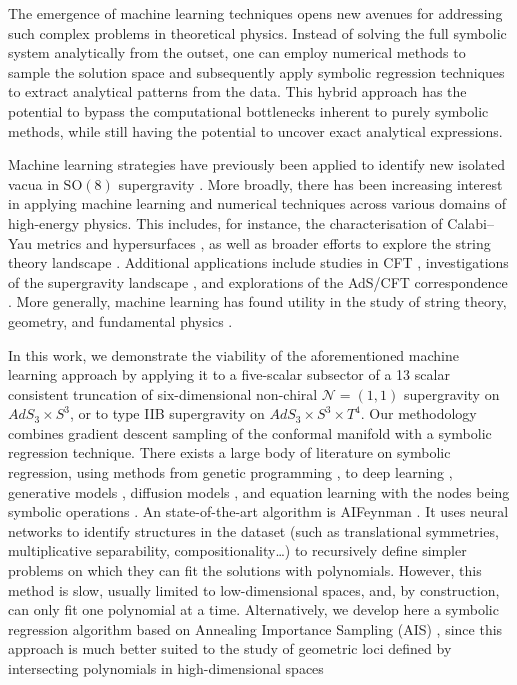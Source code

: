 \documentclass[11pt,a4paper]{article}
\begin{document}
The emergence of machine learning techniques opens new avenues for addressing such complex problems in theoretical physics. Instead of solving the full symbolic system analytically from the outset, one can employ numerical methods to sample the solution space and subsequently apply symbolic regression techniques to extract analytical patterns from the data. This hybrid approach has the potential to bypass the computational bottlenecks inherent to purely symbolic methods, while still having the potential to uncover exact analytical expressions.

Machine learning strategies have previously been applied to identify new isolated vacua in $\mathrm{SO}(8)$ supergravity \cite{Comsa:2019rcz,Berman:2022jqn}. More broadly, there has been increasing interest in applying machine learning and numerical techniques across various domains of high-energy physics. This includes, for instance, the characterisation of Calabi–Yau metrics and hypersurfaces \cite{Ashmore:2019wzb,Berman:2021mcw,Larfors:2022nep,Berglund:2022gvm,Jejjala:2020wcc,Douglas:2006rr,Larfors:2021pbb,He:2018jtw}, as well as broader efforts to explore the string theory landscape \cite{He:2017aed,Carifio:2017bov,Ruehle:2017mzq}. Additional applications include studies in CFT \cite{Chen:2020dxg}, investigations of the supergravity landscape \cite{Brady:2025zzi,Krishnan:2020sfg}, and explorations of the AdS/CFT correspondence \cite{Hashimoto:2018ftp}. More generally, machine learning has found utility in the study of string theory, geometry, and fundamental physics \cite{Ruehle:2020jrk,He:2023csq,Bao:2021auj}.

In this work, we demonstrate the viability of the aforementioned machine learning approach by applying it to a five-scalar subsector of a 13 scalar consistent truncation of six-dimensional non-chiral $\mathcal{N} = (1,1)$ supergravity on $AdS_3 \times S^3$, or to type IIB supergravity on $AdS_3 \times S^3 \times T^4$. Our methodology combines gradient descent sampling of the conformal manifold with a symbolic regression technique. There exists a large body of literature on symbolic regression, using methods from genetic programming \cite{koza1994genetic,virgolin2021improving,randall2022bingo,burlacu2019parsimony}, to deep learning \cite{petersen2019deep,kamienny2022end}, generative models \cite{valipour2021symbolicgpt}, diffusion models \cite{bastiani2025diffusion}, and equation learning with the nodes being symbolic operations \cite{2018arXiv180607259S}. An state-of-the-art algorithm is AIFeynman \cite{Udrescu:2019mnk}. It uses neural networks to identify structures in the dataset (such as translational symmetries, multiplicative separability, compositionality\dots) to recursively define simpler problems on which they can fit the solutions with polynomials.  However, this method is slow, usually limited to low-dimensional spaces, and, by construction, can only fit one polynomial at a time. Alternatively, we develop here a symbolic regression algorithm based on Annealing Importance Sampling (AIS) \cite{neal1998annealedimportancesampling}, since this approach is much better suited to the study of geometric loci defined by intersecting polynomials in high-dimensional spaces
\end{document}
